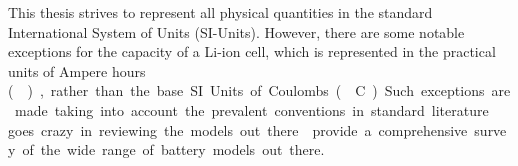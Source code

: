 
\ifpdf
    \graphicspath{{1_introduction/figures/PNG/}{1_introduction/figures/PDF/}{1_introduction/figures/}}
\else
    \graphicspath{{1_introduction/figures/EPS/}{1_introduction/figures/}}
\fi




This  thesis  strives to  represent  all  physical  quantities in  the  standard
International  System  of Units  (SI-Units).  However,  there are  some  notable
exceptions \eg{} for the capacity of a  Li-ion cell, which is represented in the
practical units of Ampere hours (\SI{}\amphours),  rather than the base SI Units
of Coulombs (\SI{}{\coulomb}). Such exceptions  are made taking into account the
prevalent conventions in standard literature.


\cite{Grazioli2016a} goes crazy in reviewing the models out there.
\cite{Seaman2014} provide a comprehensive survey of the wide range of battery models out there.

